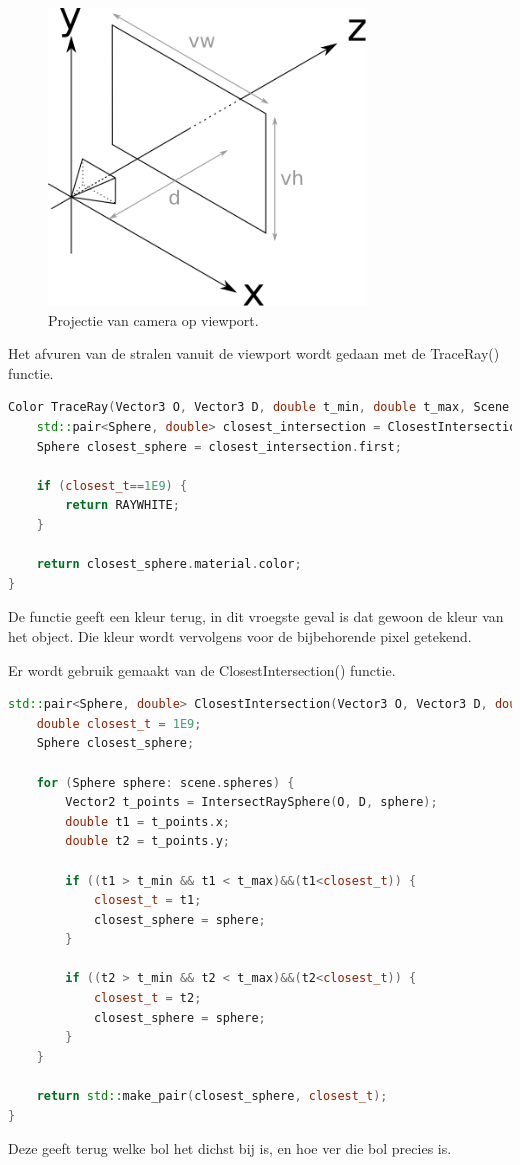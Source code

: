 \documentclass[12pt, a4paper]{article}
\begin{document}
\begin{figure}[H]
    \centering
    \includegraphics[width=0.75\textwidth]{viewport.png}
    \caption{Projectie van camera op viewport.}
    \label{fig:viewport}
\end{figure}

Het afvuren van de stralen vanuit de viewport wordt gedaan met de TraceRay() functie.

\begin{lstlisting}[language=C++]
Color TraceRay(Vector3 O, Vector3 D, double t_min, double t_max, Scene scene) {   
    std::pair<Sphere, double> closest_intersection = ClosestIntersection(O, D, t_min, t_max, scene);
    Sphere closest_sphere = closest_intersection.first;

    if (closest_t==1E9) {
        return RAYWHITE;
    }

    return closest_sphere.material.color;
}
\end{lstlisting}
De functie geeft een kleur terug, in dit vroegste geval is dat gewoon de kleur van het object. Die kleur wordt vervolgens voor de bijbehorende pixel getekend.

Er wordt gebruik gemaakt van de ClosestIntersection() functie. 

\begin{lstlisting}[language=C++]
std::pair<Sphere, double> ClosestIntersection(Vector3 O, Vector3 D, double t_min, double t_max, Scene scene) {
    double closest_t = 1E9;
    Sphere closest_sphere;

    for (Sphere sphere: scene.spheres) {
        Vector2 t_points = IntersectRaySphere(O, D, sphere);
        double t1 = t_points.x;
        double t2 = t_points.y;

        if ((t1 > t_min && t1 < t_max)&&(t1<closest_t)) {
            closest_t = t1;
            closest_sphere = sphere;
        }

        if ((t2 > t_min && t2 < t_max)&&(t2<closest_t)) {
            closest_t = t2;
            closest_sphere = sphere;
        }
    }

    return std::make_pair(closest_sphere, closest_t);
}
\end{lstlisting}
Deze geeft terug welke bol het dichst bij is, en hoe ver die bol precies is. 
\end{document}
